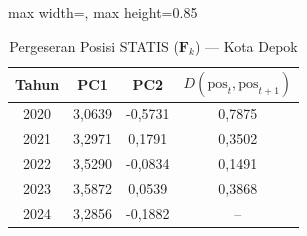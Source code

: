 \begin{table}[H]
\centering
\caption{Pergeseran Posisi STATIS ($\mathbf{F}_k$) --- Kota Depok} \label{tab:app1jarak_statis_skor_kota_depok}
\begin{adjustbox}{max width=\textwidth, max height=0.85\textheight}
\begin{tabular}{|c|c|c|c|}
\hline
\textbf{Tahun} & \textbf{PC1} & \textbf{PC2} & \textbf{$D(\text{pos}_t, \text{pos}_{t+1})$} \\
\hline
2020 & 3,0639 & -0,5731 & 0,7875 \\
2021 & 3,2971 & 0,1791 & 0,3502 \\
2022 & 3,5290 & -0,0834 & 0,1491 \\
2023 & 3,5872 & 0,0539 & 0,3868 \\
2024 & 3,2856 & -0,1882 & -- \\
\hline
\end{tabular}
\end{adjustbox}
\end{table}
